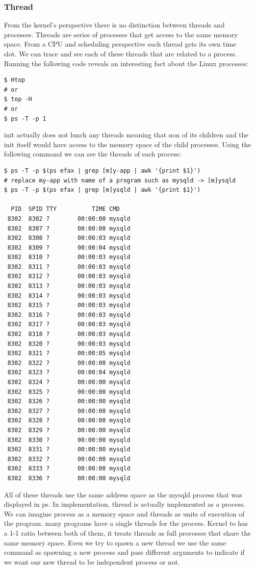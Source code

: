 \documentclass[journal,10pt,onecolumn,compsoc,letterpaper,draftclsnofoot,table,xcdraw]{IEEEtran} \usepackage[margin=0.75in]{geometry}
\begin{document}
\subsubsection{Thread}
\noindent From the kernel's perspective there is no distinction between threads and processes. Threads are series of processes that get access to the same memory space. From a CPU and scheduling perspective each thread gets its own time slot. We can trace and see each of these threads that are related to a process. Running the following code reveals an interesting fact about the Linux processes:
\begin{verbatim}
$ Htop
# or
$ top -H
# or
$ ps -T -p 1
\end{verbatim}
\noindent init actually does not lunch any threads meaning that non of its children and the init itself would have access to the memory space of the child processes. Using the following command we can see the threads of each process:
\begin{verbatim}
$ ps -T -p $(ps efax | grep [m]y-app | awk '{print $1}')
# replace my-app with name of a program such as mysqld -> [m]ysqld
$ ps -T -p $(ps efax | grep [m]ysqld | awk '{print $1}')

  PID  SPID TTY          TIME CMD
 8302  8302 ?        00:00:00 mysqld
 8302  8307 ?        00:00:00 mysqld
 8302  8308 ?        00:00:03 mysqld
 8302  8309 ?        00:00:04 mysqld
 8302  8310 ?        00:00:03 mysqld
 8302  8311 ?        00:00:03 mysqld
 8302  8312 ?        00:00:03 mysqld
 8302  8313 ?        00:00:03 mysqld
 8302  8314 ?        00:00:03 mysqld
 8302  8315 ?        00:00:03 mysqld
 8302  8316 ?        00:00:03 mysqld
 8302  8317 ?        00:00:03 mysqld
 8302  8318 ?        00:00:03 mysqld
 8302  8320 ?        00:00:03 mysqld
 8302  8321 ?        00:00:05 mysqld
 8302  8322 ?        00:00:00 mysqld
 8302  8323 ?        00:00:04 mysqld
 8302  8324 ?        00:00:00 mysqld
 8302  8325 ?        00:00:00 mysqld
 8302  8326 ?        00:00:00 mysqld
 8302  8327 ?        00:00:00 mysqld
 8302  8328 ?        00:00:00 mysqld
 8302  8329 ?        00:00:00 mysqld
 8302  8330 ?        00:00:00 mysqld
 8302  8331 ?        00:00:00 mysqld
 8302  8332 ?        00:00:00 mysqld
 8302  8333 ?        00:00:00 mysqld
 8302  8336 ?        00:00:00 mysqld

\end{verbatim}
\noindent All of these threads use the same address space as the mysqld process that was displayed in ps. In implementation, thread is actually implemented as a process. We can imagine process as a memory space and threads as units of execution of the program. many programs have a single threads for the process. Kernel to has a 1-1 ratio between both of them, it treats threads as full processes that share the same memory space. Even we try to spawn a new thread we use the same command as spawning a new process and pass different arguments to indicate if we want our new thread to be independent process or not.
\end{document}
